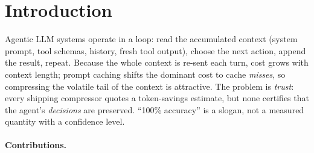 \documentclass[11pt]{article}
\begin{document}
\section{Introduction}
Agentic LLM systems operate in a loop: read the accumulated context (system prompt,
tool schemas, history, fresh tool output), choose the next action, append the
result, repeat. Because the whole context is re-sent each turn, cost grows with
context length; prompt caching shifts the dominant cost to cache \emph{misses}, so
compressing the volatile tail of the context is attractive. The problem is
\emph{trust}: every shipping compressor quotes a token-savings estimate, but none
certifies that the agent's \emph{decisions} are preserved. ``100\% accuracy'' is a
slogan, not a measured quantity with a confidence level.

\paragraph{Contributions.}
\end{document}
